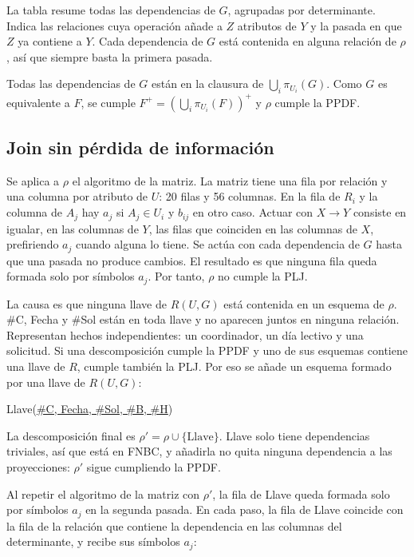 

La tabla resume todas las dependencias de $G$, agrupadas por determinante. Indica las relaciones cuya operación añade a $Z$ atributos de $Y$ y la pasada en que $Z$ ya contiene a $Y$. Cada dependencia de $G$ está contenida en alguna relación de $\rho$, así que siempre basta la primera pasada.



Todas las dependencias de $G$ están en la clausura de $\bigcup_i \pi_{U_i}(G)$. Como $G$ es equivalente a $F$, se cumple $F^+ = (\bigcup_i \pi_{U_i}(F))^+$ y $\rho$ cumple la PPDF.

\subsection{Join sin pérdida de información}

Se aplica a $\rho$ el algoritmo de la matriz. La matriz tiene una fila por relación y una columna por atributo de $U$: 20 filas y 56 columnas. En la fila de $R_i$ y la columna de $A_j$ hay $a_j$ si $A_j \in U_i$ y $b_{ij}$ en otro caso. Actuar con $X \to Y$ consiste en igualar, en las columnas de $Y$, las filas que coinciden en las columnas de $X$, prefiriendo $a_j$ cuando alguna lo tiene. Se actúa con cada dependencia de $G$ hasta que una pasada no produce cambios. El resultado es que ninguna fila queda formada solo por símbolos $a_j$. Por tanto, $\rho$ no cumple la PLJ.

La causa es que ninguna llave de $R(U, G)$ está contenida en un esquema de $\rho$. \#C, Fecha y \#Sol están en toda llave y no aparecen juntos en ninguna relación. Representan hechos independientes: un coordinador, un día lectivo y una solicitud. Si una descomposición cumple la PPDF y uno de sus esquemas contiene una llave de $R$, cumple también la PLJ. Por eso se añade un esquema formado por una llave de $R(U, G)$:
\begin{center}
  Llave(\underline{\#C, Fecha, \#Sol, \#B, \#H})
\end{center}
La descomposición final es $\rho' = \rho \cup \{\text{Llave}\}$. Llave solo tiene dependencias triviales, así que está en FNBC, y añadirla no quita ninguna dependencia a las proyecciones: $\rho'$ sigue cumpliendo la PPDF.

Al repetir el algoritmo de la matriz con $\rho'$, la fila de Llave queda formada solo por símbolos $a_j$ en la segunda pasada. En cada paso, la fila de Llave coincide con la fila de la relación que contiene la dependencia en las columnas del determinante, y recibe sus símbolos $a_j$:

